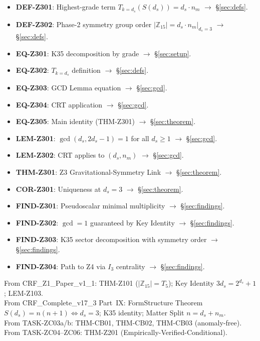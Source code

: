 \documentclass[12pt, a4paper]{article}
\begin{document}
\begin{formalbox}[title={Atomic units introduced by TASK-ZC07}]
\begin{itemize}[leftmargin=*]
  \item \textbf{DEF-Z301}: Highest-grade term $T_{k=d_s}(S(d_s))
    = d_s \cdot n_m$ $\to$ \S\ref{sec:defs}.
  \item \textbf{DEF-Z302}: Phase-2 symmetry group order
    $|\mathbb{Z}_{15}| = d_s \cdot n_m|_{d_s=3}$ $\to$ \S\ref{sec:defs}.
  \item \textbf{EQ-Z301}: K35 decomposition by grade $\to$
    \S\ref{sec:setup}.
  \item \textbf{EQ-Z302}: $T_{k=d_s}$ definition $\to$ \S\ref{sec:defs}.
  \item \textbf{EQ-Z303}: GCD Lemma equation $\to$ \S\ref{sec:gcd}.
  \item \textbf{EQ-Z304}: CRT application $\to$ \S\ref{sec:gcd}.
  \item \textbf{EQ-Z305}: Main identity (THM-Z301) $\to$
    \S\ref{sec:theorem}.
  \item \textbf{LEM-Z301}: $\gcd(d_s, 2d_s-1) = 1$ for all
    $d_s \geq 1$ $\to$ \S\ref{sec:gcd}.
  \item \textbf{LEM-Z302}: CRT applies to $(d_s, n_m)$ $\to$
    \S\ref{sec:gcd}.
  \item \textbf{THM-Z301}: Z3 Gravitational-Symmetry Link $\to$
    \S\ref{sec:theorem}.
  \item \textbf{COR-Z301}: Uniqueness at $d_s=3$ $\to$
    \S\ref{sec:theorem}.
  \item \textbf{FIND-Z301}: Pseudoscalar minimal multiplicity $\to$
    \S\ref{sec:findings}.
  \item \textbf{FIND-Z302}: $\gcd = 1$ guaranteed by Key Identity
    $\to$ \S\ref{sec:findings}.
  \item \textbf{FIND-Z303}: K35 sector decomposition with symmetry
    order $\to$ \S\ref{sec:findings}.
  \item \textbf{FIND-Z304}: Path to Z4 via $I_3$ centrality $\to$
    \S\ref{sec:findings}.
\end{itemize}
\end{formalbox}

\begin{formalbox}[title={Atomic units inherited (not modified)}]
From CRF\_Z1\_Paper\_v1\_1: THM-Z101 ($|\mathbb{Z}_{15}| = T_5$);
Key Identity $3d_s = 2^{d_s}+1$; LEM-Z103. \\
From CRF\_Complete\_v17\_3 Part~IX: FormStructure Theorem
$S(d_s) = n(n+1) \iff d_s = 3$; K35 identity; Matter Split
$n = d_s + n_m$. \\
From TASK-ZC03a/b: THM-CB01, THM-CB02, THM-CB03 (anomaly-free). \\
From TASK-ZC04--ZC06: THM-Z201 (Empirically-Verified-Conditional).
\end{formalbox}
\end{document}
